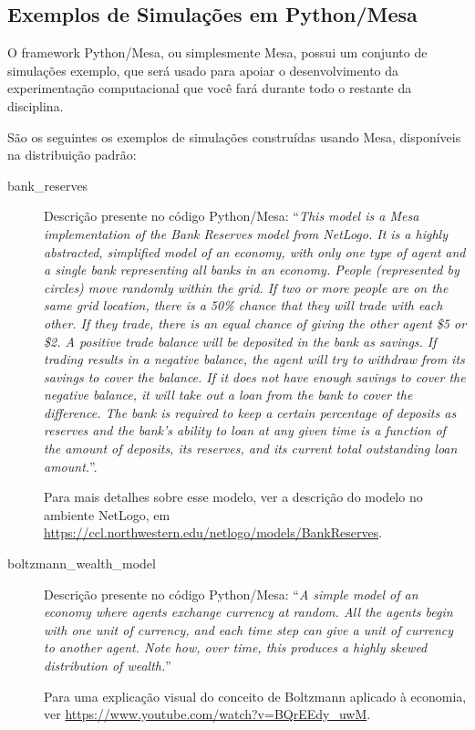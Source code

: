 \subsection{Exemplos de Simulações em Python/Mesa}

O framework Python/Mesa, ou simplesmente Mesa, possui um conjunto de simulações exemplo, que será usado para apoiar o desenvolvimento da experimentação computacional que você fará durante todo o restante da disciplina.

São os seguintes os exemplos de simulações construídas usando Mesa, disponíveis na distribuição padrão:
\begin{description}
\item [bank\_reserves] 

Descrição presente no código Python/Mesa: ``\textit{This model is a Mesa implementation of the Bank Reserves model from NetLogo. It is a highly abstracted, simplified model of an economy, with only one type of agent and a single bank representing all banks in an economy. People (represented by circles) move randomly within the grid. If two or more people are on the same grid location, there is a 50\% chance that they will trade with each other. If they trade, there is an equal chance of giving the other agent \$5 or \$2. A positive trade balance will be deposited in the bank as savings. If trading results in a negative balance, the agent will try to withdraw from its savings to cover the balance. If it does not have enough savings to cover the negative balance, it will take out a loan from the bank to cover the difference. The bank is required to keep a certain percentage of deposits as reserves and the bank's ability to loan at any given time is a function of the amount of deposits, its reserves, and its current total outstanding loan amount.}''. 

Para mais detalhes sobre esse modelo, ver a descrição do modelo no ambiente NetLogo, em 
\url{https://ccl.northwestern.edu/netlogo/models/BankReserves}.

\item [boltzmann\_wealth\_model] 

Descrição presente no código Python/Mesa: ``\textit{A simple model of an economy where agents exchange currency at random. All the agents begin with one unit of currency, and each time step can give a unit of currency to another agent. Note how, over time, this produces a highly skewed distribution of wealth.}''

Para uma explicação visual do conceito de Boltzmann aplicado à economia, ver \url{https://www.youtube.com/watch?v=BQrEEdy_uwM}.


\end{description}
